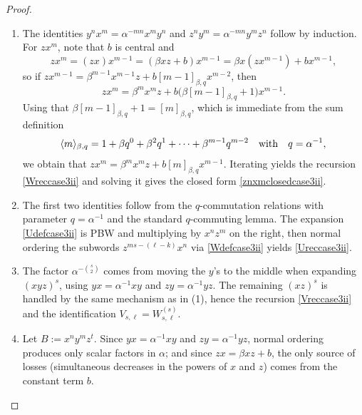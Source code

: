 \documentclass{amsart}
\theoremstyle{definition}
\theoremstyle{remark}
\numberwithin{equation}{section}
\begin{document}
\begin{proof}
\begin{enumerate}
\item [\rm (1)] The identities $y^n x^m=\alpha^{-mn}x^m y^n$ and $z^n y^m=\alpha^{-mn}y^m z^n$ follow by induction.
For $zx^m$, note that $b$ is central and
\[
zx^m=(zx)x^{m-1}=(\beta xz+b)x^{m-1} =\beta x(zx^{m-1})+b x^{m-1},
\]
so if $zx^{m-1}=\beta^{m-1}x^{m-1}z+b[m-1]_{\beta,q}x^{m-2}$, then
\[
zx^m=\beta^m x^m z+b\big(\beta[m-1]_{\beta,q}+1\big)x^{m-1}.
\]
Using that $\beta[m-1]_{\beta,q}+1=[m]_{\beta,q}$, which is immediate from the sum definition 
$$
\langle m\rangle_{\beta,q}=1+\beta q^{0}+\beta^{2}q^{1}+\cdots+\beta^{m-1}q^{m-2} \quad {\rm with} \quad q = \alpha^{-1},
$$
we obtain that $zx^m=\beta^m x^m z+b[m]_{\beta,q}x^{m-1}$. Iterating yields the recursion \eqref{Wreccase3ii} and solving it gives the closed form \eqref{znxmclosedcase3ii}.

\item [\rm (2)] The first two identities follow from the $q$-commutation relations with parameter $q=\alpha^{-1}$ and the
standard $q$-commuting lemma. The expansion \eqref{Udefcase3ii} is PBW and multiplying by $x^n z^m$ on the right, then normal ordering the subwords $z^{ms-(\ell-k)}x^n$ via \eqref{Wdefcase3ii} yields \eqref{Ureccase3ii}.

\item [\rm (3)] The factor $\alpha^{-\binom{s}{2}}$ comes from moving the $y$'s to the middle when expanding $(xyz)^s$, using $yx=\alpha^{-1}xy$ and $zy=\alpha^{-1}yz$. The remaining $(xz)^s$ is handled by the same mechanism as in \textup{(1)}, hence the recursion \eqref{Vreccase3ii} and the identification $V_{s,\ell}=W^{(s)}_{s,\ell}$.

\item [\rm (4)] Let $B:=x^{n}y^{m}z^{t}$. Since $yx=\alpha^{-1}xy$ and $zy=\alpha^{-1}yz$, normal ordering produces only scalar factors in $\alpha$; and since $zx=\beta xz+b$, the only source of losses (simultaneous decreases in the powers of $x$ and $z$) comes from the constant term $b$.


\end{enumerate}
\end{proof}
\end{document}
